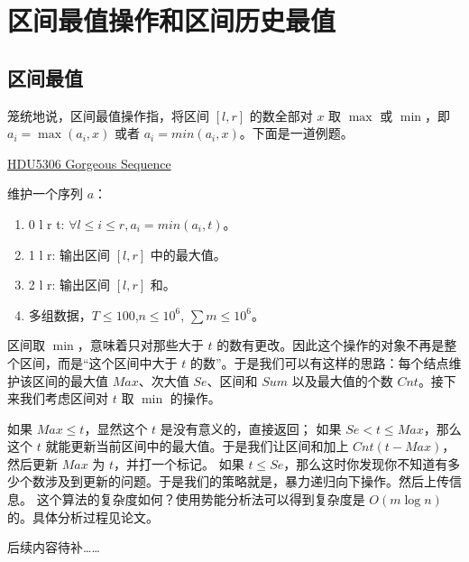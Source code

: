 \section{区间最值操作和区间历史最值}
\subsection{区间最值}
笼统地说，区间最值操作指，将区间 $[l,r]$ 的数全部对 $x$ 取 $\max$ 或 $\min$，即 $a_i=\max(a_i, x)$ 或者 $a_i=min(a_i,x)$。下面是一道例题。\par 
	\href{https://acm.hdu.edu.cn/showproblem.php?pid=5306}{HDU5306 Gorgeous Sequence} \par 
	维护一个序列 $a$：
	\begin{enumerate}
		\item 0 l r t:  $\forall l \le i \le r, a_i = min(a_i, t)$。
		\item 1 l r: 输出区间 $[l, r]$ 中的最大值。
		\item 2 l r: 输出区间 $[l, r]$ 和。
		\item 多组数据，$T \le 100$,$n \le 10^6$, $\sum{m} \le 10^6$。
	\end{enumerate}
	区间取 $\min$，意味着只对那些大于 $t$ 的数有更改。因此这个操作的对象不再是整个区间，而是“这个区间中大于 $t$ 的数”。于是我们可以有这样的思路：每个结点维护该区间的最大值 $Max$、次大值 $Se$、区间和 $Sum$ 以及最大值的个数 $Cnt$。接下来我们考虑区间对 $t$ 取 $\min$ 的操作。

	如果 $Max \le t$，显然这个 $t$ 是没有意义的，直接返回；
	如果 $Se < t \le Max$，那么这个 $t$ 就能更新当前区间中的最大值。于是我们让区间和加上 $Cnt(t - Max)$，然后更新 $Max$ 为 $t$，并打一个标记。
	如果 $t \le Se$，那么这时你发现你不知道有多少个数涉及到更新的问题。于是我们的策略就是，暴力递归向下操作。然后上传信息。
	这个算法的复杂度如何？使用势能分析法可以得到复杂度是 $O(m \log n)$ 的。具体分析过程见论文。
	
	
	后续内容待补……